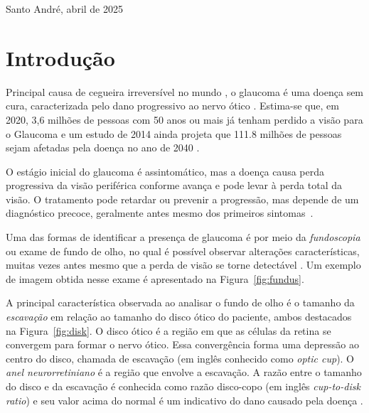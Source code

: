 \documentclass[12pt]{article}
\begin{document}
\begin{center}
Santo André, abril de 2025
\end{center}

\newpage
\bigskip

\section{Introdução}
\label{sec:introducao}

Principal causa de cegueira irreversível no mundo \cite{steinmetz_causes_2021}, o glaucoma é uma doença sem cura, caracterizada pelo dano progressivo ao nervo ótico \cite{who_2019}. Estima-se que, em 2020, 3,6 milhões de pessoas com 50 anos ou mais já tenham perdido a visão para o Glaucoma \cite{steinmetz_causes_2021} e um estudo de 2014 ainda projeta que 111.8 milhões de pessoas sejam afetadas pela doença no ano de 2040 \cite{tham_global_2014}.

O estágio inicial do glaucoma é assintomático, mas a doença causa perda progressiva da visão periférica conforme avança e pode levar à perda total da visão. O tratamento pode retardar ou prevenir a progressão, mas depende de um diagnóstico precoce, geralmente antes mesmo dos primeiros sintomas~\cite{who_2019}.

Uma das formas de identificar a presença de glaucoma é por meio da \emph{fundoscopia} ou exame de fundo de olho, no qual é possível observar alterações características, muitas vezes antes mesmo que a perda de visão se torne detectável \cite{weinreb_2004}. Um exemplo de imagem obtida nesse exame é apresentado na Figura~\ref{fig:fundus}.

A principal característica observada ao analisar o fundo de olho é o tamanho da \emph{escavação} em relação ao tamanho do disco ótico do paciente, ambos destacados na Figura~\ref{fig:disk}. O disco ótico é a região em que as células da retina se convergem para formar o nervo ótico. Essa convergência forma uma depressão ao centro do disco, chamada de escavação (em inglês conhecido como \emph{optic cup}). O \emph{anel neurorretiniano} é a região que envolve a escavação. A razão entre o tamanho do disco e da escavação é conhecida como razão disco-copo (em inglês \emph{cup-to-disk ratio}) e seu valor acima do normal é um indicativo do dano causado pela doença \cite{weinreb_2004}. %
\end{document}
